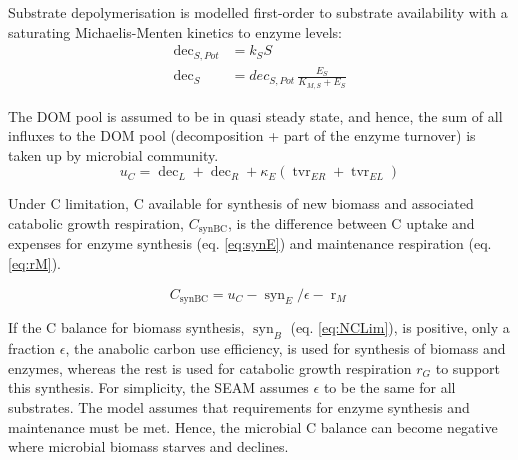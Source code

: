 % 
Substrate depolymerisation is modelled first-order to substrate
availability with a saturating Michaelis-Menten kinetics to enzyme levels:
\begin{subequations}
\label{eq:dec}
\begin{align}
\operatorname{dec}_{S,Pot} &= k_S S
\\ 
\operatorname{dec}_S &= dec_{S,Pot} \, \frac{E_S}{K_{M,S} + E_S}
\end{align}
\end{subequations}
 
The DOM pool is assumed to be in quasi steady state, and hence, the sum of all
influxes to the DOM pool (decomposition + part of the enzyme turnover) is taken
up by microbial community.
\begin{equation}
\label{eq:uC}
u_C = \operatorname{dec}_L + \operatorname{dec}_R +  \kappa_E
(\operatorname{tvr}_{ER} + \operatorname{tvr}_{EL})
\end{equation}

Under C limitation, C available for synthesis of new biomass and
associated catabolic growth respiration, $C_{\operatorname{synBC}}$, is the
difference between C uptake and expenses for enzyme synthesis (eq.
\ref{eq:synE}) and maintenance respiration (eq.
\ref{eq:rM}).

\begin{equation}
\label{eq:synBC} 
C_{\operatorname{synBC}} = u_C -
\operatorname{syn}_E/\epsilon - \operatorname{r}_{M}
\end{equation}

If the C balance for biomass synthesis, $\operatorname{syn}_B$ (eq.
\ref{eq:NCLim}), is positive, only a fraction $\epsilon$, the anabolic
carbon use efficiency, is used for synthesis of biomass and enzymes,
whereas the rest is used for catabolic growth respiration $r_G$ to support this
synthesis. For simplicity, the SEAM assumes $\epsilon$ to be the same for
all substrates.
The model assumes that requirements for enzyme synthesis and maintenance must be
met. Hence, the microbial C balance can become negative where microbial biomass starves
and declines.

